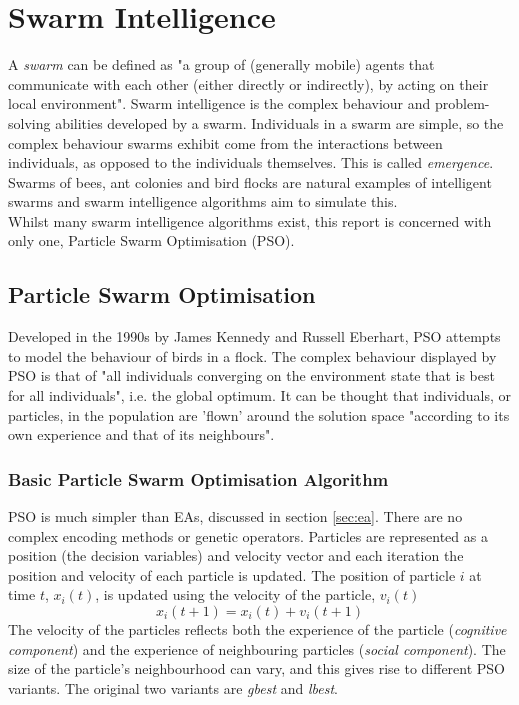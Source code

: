 \section{Swarm Intelligence}
A \emph{swarm} can be defined as "a group of (generally mobile) agents that communicate with each other (either directly or indirectly), by acting on their local environment"\cite{4-IV}. Swarm intelligence is the complex behaviour and problem-solving abilities developed by a swarm. Individuals in a swarm are simple, so the complex behaviour swarms exhibit come from the interactions between individuals, as opposed to the individuals themselves. This is called \emph{emergence}\cite{4-IV}. Swarms of bees, ant colonies and bird flocks are natural examples of intelligent swarms and swarm intelligence algorithms aim to simulate this.
\\Whilst many swarm intelligence algorithms exist, this report is concerned with only one, Particle Swarm Optimisation (PSO).

\subsection{Particle Swarm Optimisation}
Developed in the 1990s by James Kennedy and Russell Eberhart, PSO attempts to model the behaviour of birds in a flock\cite{4-pso, mopso}. The complex behaviour displayed by PSO is that of "all individuals converging on the environment state that is best for all individuals"\cite{4-IV}, i.e. the global optimum. It can be thought that individuals, or particles, in the population are 'flown' around the solution space "according to its own experience and that of its neighbours"\cite{4-pso, mopso}.

\subsubsection{Basic Particle Swarm Optimisation Algorithm}
PSO is much simpler than EAs, discussed in section \ref{sec:ea}. There are no complex encoding methods or genetic operators. Particles are represented as a position (the decision variables) and velocity vector and each iteration the position and velocity of each particle is updated. The position of particle $i$ at time $t$, $x_{i}(t)$, is updated using the velocity of the particle, $v_{i}(t)$\cite{4-pso, mopso, psot}
\begin{equation}
  x_{i}(t+1) = x_{i}(t) + v_{i}(t+1)
\label{eq:pos}
\end{equation}
The velocity of the particles reflects both the experience of the particle (\emph{cognitive component}) and the experience of neighbouring particles (\emph{social component}). The size of the particle's neighbourhood can vary, and this gives rise to different PSO variants. The original two variants are \emph{gbest} and \emph{lbest}.

